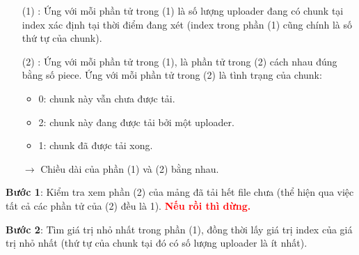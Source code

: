\documentclass[a4paper]{article}
\begin{document}
\begin{itemize}
    \item [(1)]:  Ứng với mỗi phần tử trong (1) là số lượng uploader đang có chunk tại index xác định tại thời điểm đang xét (index trong phần (1) cũng chính là số thứ tự của chunk).
    \item [(2)]:  Ứng với mỗi phần tử trong (1), là phần tử trong (2) cách nhau đúng bằng số piece. Ứng với mỗi phần tử trong (2) là tình trạng của chunk:
    \begin{itemize}
        \item 0: chunk này vẫn chưa được tải.
        \item 2: chunk này đang được tải bởi một uploader.
        \item 1: chunk đã được tải xong.
    \end{itemize}
    \item[$\rightarrow$] Chiều dài của phần (1) và (2) bằng nhau.
\end{itemize}

\textbf{Bước 1}: Kiểm tra xem phần (2) của mảng đã tải hết file chưa (thể hiện qua việc tất cả các phần tử của (2) đều là 1). \textbf{\textcolor{red}{Nếu rồi thì dừng.}}

\textbf{Bước 2}: Tìm giá trị nhỏ nhất trong phần (1), đồng thời lấy giá trị index của giá trị nhỏ nhất (thứ tự của chunk tại đó có số lượng uploader là ít nhất).
\end{document}
